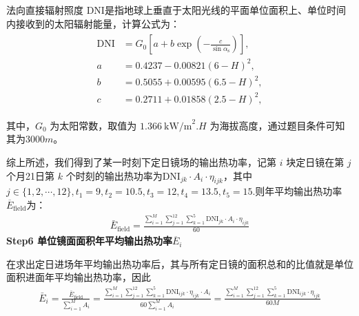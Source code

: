 \documentclass[../main.tex]{subfiles}
\begin{document}
\par 法向直接辐射照度 $\text{DNI}$是指地球上垂直于太阳光线的平面单位面积上、单位时间内接收到的太阳辐射能量，计算公式为：
\begin{align}\label{1.49}
\begin{split}
\text{DNI} &= G_0 \left[ a + b \exp\left(-\frac{c}{\sin\alpha_{\text{s}}}\right) \right], \\
a &= 0.4237 - 0.00821(6 - H)^2, \\
b &= 0.5055 + 0.00595(6.5 - H)^2, \\
c &= 0.2711 + 0.01858(2.5 - H)^2,
\end{split}
\end{align}
\par 其中，$G_0$ 为太阳常数，取值为 \(1.366\ \text{kW/m}^2\).$H$ 为海拔高度，通过题目条件可知其为$3000m$。 
\par 综上所述，我们得到了某一时刻下定日镜场的输出热功率，记第 \(i\) 块定日镜在第 \(j\) 个月21日第 \(k\) 个时刻的输出热功率为$ \text{DNI}_{jk} \cdot A_i \cdot \eta_{ijk}$，其中$j\in \{1,2,\cdots,12\},t_1=9,t_2=10.5,t_3=12,t_4=13.5,t_5=15$.则年平均输出热功率$\overline{E}_{\text{field}}$为：
\begin{align}\label{1.51}
  \bar{E}_{\text{field}} = \frac{\sum_{i=1}^{M} \sum_{j=1}^{12} \sum_{k=1}^{5} \text{DNI}_{jk} \cdot A_i \cdot \eta_{ijk}}{60}
\end{align}
\noindent \textbf{Step6 单位镜面面积年平均输出热功率$\overline{E}_{i}$}
\par 在求出定日进场年平均输出热功率后，其与所有定日镜的面积总和的比值就是单位面积进面年平均输出热功率，因此
\begin{align}\label{1.52}
  \bar{E}_i = \frac{\bar{E}_{\text{field}}}{\sum_{i=1}^{M} A_i} =\frac{\sum_{i=1}^{M} \sum_{j=1}^{12} \sum_{k=1}^{5} \text{DNI}_{ijk} \cdot \eta_{ijk} \cdot A_i}{60 \sum_{i=1}^{M} A_i}=\frac{\sum_{i=1}^{M} \sum_{j=1}^{12} \sum_{k=1}^{5} \text{DNI}_{ijk} \cdot \eta_{ijk}}{60M} 
\end{align}
\end{document}
